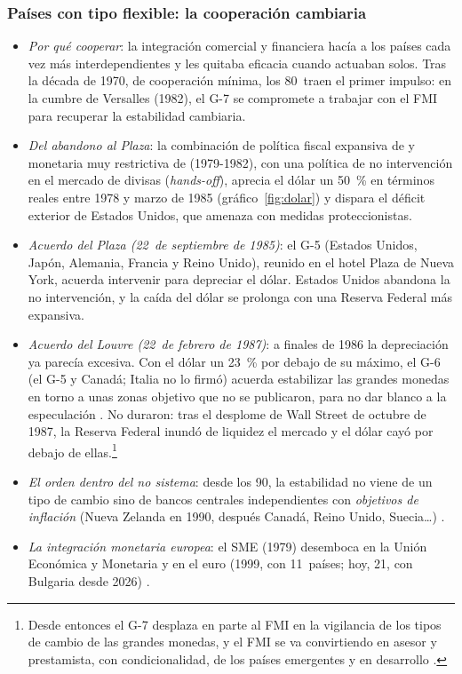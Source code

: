 \documentclass[11pt]{article}
\begin{document}
\subsubsection{Países con tipo flexible: la cooperación cambiaria}\label{sec:cooperacion}

\begin{itemize}
\item \emph{Por qué cooperar}: la integración comercial y financiera hacía a los países cada vez más interdependientes y les quitaba eficacia cuando actuaban solos. Tras la década de 1970, de cooperación mínima, los 80~traen el primer impulso: en la cumbre de Versalles (1982), el G-7 se compromete a trabajar con el FMI para recuperar la estabilidad cambiaria.
\item \emph{Del abandono al Plaza}: la combinación de política fiscal expansiva de  y monetaria muy restrictiva de  (1979-1982), con una política de no intervención en el mercado de divisas (\emph{hands-off}), aprecia el dólar un 50~\% en términos reales entre 1978 y marzo de 1985 (gráfico~\ref{fig:dolar}) y dispara el déficit exterior de Estados Unidos, que amenaza con medidas proteccionistas.
\item \emph{Acuerdo del Plaza (22~de septiembre de 1985)}: el G-5 (Estados Unidos, Japón, Alemania, Francia y Reino Unido), reunido en el hotel Plaza de Nueva York, acuerda intervenir para depreciar el dólar. Estados Unidos abandona la no intervención, y la caída del dólar se prolonga con una Reserva Federal más expansiva\nocite{G51985Plaza,Frankel2015Plaza}.
\item \emph{Acuerdo del Louvre (22~de febrero de 1987)}: a finales de 1986 la depreciación ya parecía excesiva. Con el dólar un 23~\% por debajo de su máximo, el G-6 (el G-5 y Canadá; Italia no lo firmó) acuerda estabilizar las grandes monedas en torno a unas zonas objetivo que no se publicaron, para no dar blanco a la especulación\nocite{G61987Louvre} . No duraron: tras el desplome de Wall Street de octubre de 1987, la Reserva Federal inundó de liquidez el mercado y el dólar cayó por debajo de ellas.\footnote{Desde entonces el G-7 desplaza en parte al FMI en la vigilancia de los tipos de cambio de las grandes monedas, y el FMI se va convirtiendo en asesor y prestamista, con condicionalidad, de los países emergentes y en desarrollo .}
\item \emph{El orden dentro del no sistema}: desde los 90, la estabilidad no viene de un tipo de cambio sino de bancos centrales independientes con \emph{objetivos de inflación} (Nueva Zelanda en 1990, después Canadá, Reino Unido, Suecia\dots) .
\item \emph{La integración monetaria europea}: el SME (1979) desemboca en la Unión Económica y Monetaria y en el euro (1999, con 11~países; hoy, 21, con Bulgaria desde 2026)\nocite{BCE2026Euro} .
\end{itemize}
\end{document}

